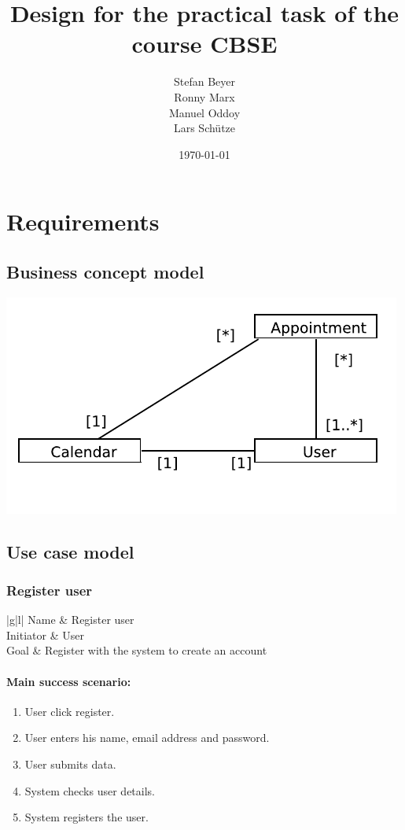\documentclass[a4paper]{scrartcl}
\title{Design for the practical task of the course CBSE}
\author{Stefan Beyer \\ Ronny Marx \\ Manuel Oddoy \\ Lars Schütze}
\date{\today}
\begin{document}
\maketitle
\pagebreak

\tableofcontents
\pagebreak

\section{Requirements}
\subsection{Business concept model}

\includegraphics{pictures/BusinessConceptModel}

\subsection{Use case model}
\subsubsection{Register user}

\begin{tabular}{|g|l|}
	\hline Name      & Register user                                 \\ 
	\hline Initiator & User                                          \\ 
	\hline Goal      & Register with the system to create an account \\ 
	\hline
\end{tabular}

\paragraph{Main success scenario:}
\begin{enumerate}
	\item User click register.
	\item User enters his name, email address and password.
	\item User submits data.
	\item System checks user details.
	\item System registers the user.
\end{enumerate}
\end{document}
